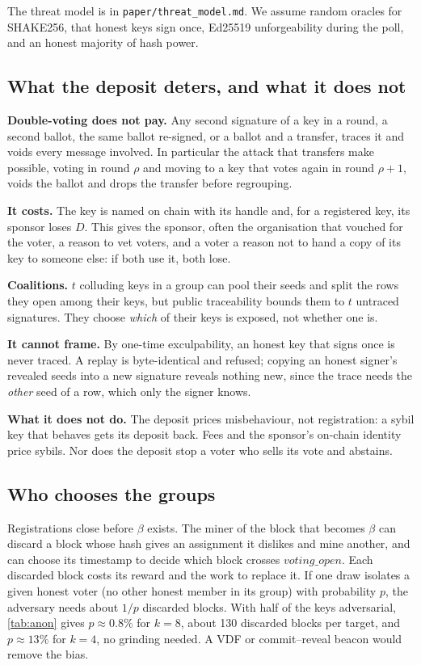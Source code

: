 \documentclass[11pt,a4paper]{article}
\theoremstyle{definition}
\begin{document}
The threat model is in \texttt{paper/threat\_model.md}. We assume random
oracles for SHAKE256, that honest keys sign once, Ed25519 unforgeability
during the poll, and an honest majority of hash power.

\subsection{What the deposit deters, and what it does not}

\textbf{Double-voting does not pay.} Any second signature of a key in a
round, a second ballot, the same ballot re-signed, or a ballot and a
transfer, traces it and voids every message involved. In particular the
attack that transfers make possible, voting in round $\rho$ and moving to
a key that votes again in round $\rho + 1$, voids the ballot and drops the
transfer before regrouping.

\textbf{It costs.} The key is named on chain with its handle and, for a
registered key, its sponsor loses $D$. This gives the sponsor, often the
organisation that vouched for the voter, a reason to vet voters, and a
voter a reason not to hand a copy of its key to someone else: if both use
it, both lose.

\textbf{Coalitions.} $t$ colluding keys in a group can pool their seeds
and split the rows they open among their keys, but public traceability
bounds them to $t$ untraced signatures. They choose \emph{which} of their
keys is exposed, not whether one is.

\textbf{It cannot frame.} By one-time exculpability, an honest key that
signs once is never traced. A replay is byte-identical and refused;
copying an honest signer's revealed seeds into a new signature reveals
nothing new, since the trace needs the \emph{other} seed of a row, which
only the signer knows.

\textbf{What it does not do.} The deposit prices misbehaviour, not
registration: a sybil key that behaves gets its deposit back. Fees and
the sponsor's on-chain identity price sybils. Nor does the deposit stop a
voter who sells its vote and abstains.

\subsection{Who chooses the groups}
\label{sec:bias}

Registrations close before $\beta$ exists. The miner of the block that
becomes $\beta$ can discard a block whose hash gives an assignment it
dislikes and mine another, and can choose its timestamp to decide which
block crosses $\mathit{voting\_open}$. Each discarded block costs its
reward and the work to replace it. If one draw isolates a given honest
voter (no other honest member in its group) with probability $p$, the
adversary needs about $1/p$ discarded blocks. With half of the keys
adversarial, \cref{tab:anon} gives $p \approx 0.8\%$ for $k = 8$, about
130 discarded blocks per target, and $p \approx 13\%$ for $k = 4$, no
grinding needed. A VDF or commit--reveal beacon would remove the bias.
\end{document}
